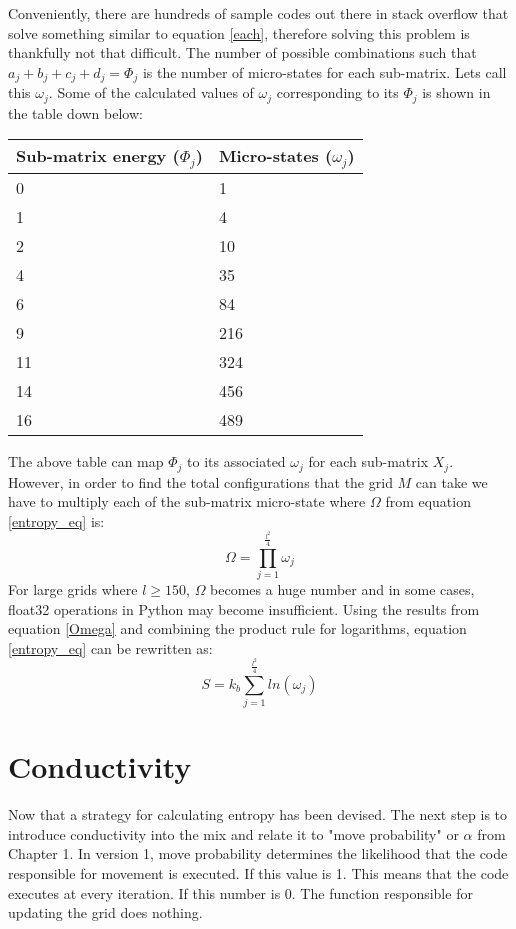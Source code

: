 \vspace{0.3cm}
\noindent
Conveniently, there are hundreds of sample codes out there in stack overflow that solve something similar to equation \ref{each}, therefore solving this problem is thankfully not that difficult. The number of possible combinations such that $a_{j}+b_{j}+c_{j}+d_{j}=\Phi_{j}$ is the number of micro-states for each sub-matrix. Lets call this $\omega_{j}$. Some of the calculated values of $\omega_{j}$ corresponding to its $\Phi_{j}$ is shown in the table down below: 
\begin{center}
\begin{tabular}{ |p{4.3cm}|p{3.2cm}|  }
 \hline
Sub-matrix energy ($\Phi_{j}$)& Micro-states ($\omega_{j}$)\\
 \hline
 0 & 1 \\
 1 & 4  \\
 2 & 10 \\
 4 & 35  \\
 6 & 84  \\
 9 & 216  \\
 11 & 324  \\
 14 & 456 \\ 
 16 & 489 \\
\hline
\end{tabular}
\end{center} 
The above table can map $\Phi_{j}$ to its associated $\omega_{j}$ for each sub-matrix $X_{j}$. However, in order to find the total configurations that the grid $M$ can take we have to multiply each of the sub-matrix micro-state where $\Omega$ from equation \ref{entropy_eq} is: 
\begin{equation}
    \Omega=\prod_{j=1}^{\frac{l^2}{4}} \omega_{j}
    \label{Omega}
\end{equation}
For large grids where $l \ge 150$, $\Omega$ becomes a huge number and in some cases, float32 operations in Python may become insufficient. Using the results from equation \ref{Omega} and combining the product rule for logarithms, equation \ref{entropy_eq} can be rewritten as: 
\begin{equation}
    S=k_b\sum_{j=1}^{\frac{l^2}{4}} ln(\omega_{j})
    \label{Total_entropy}
\end{equation}
\section{Conductivity}
Now that a strategy for calculating entropy has been devised. The next step is to introduce conductivity into the mix and relate it to "move probability" or $\alpha$ from Chapter 1. In version 1, move probability determines the likelihood that the code responsible for movement is executed. If this value is 1. This means that the code executes at every iteration. If this number is 0. The function responsible for updating the grid does nothing. \par

